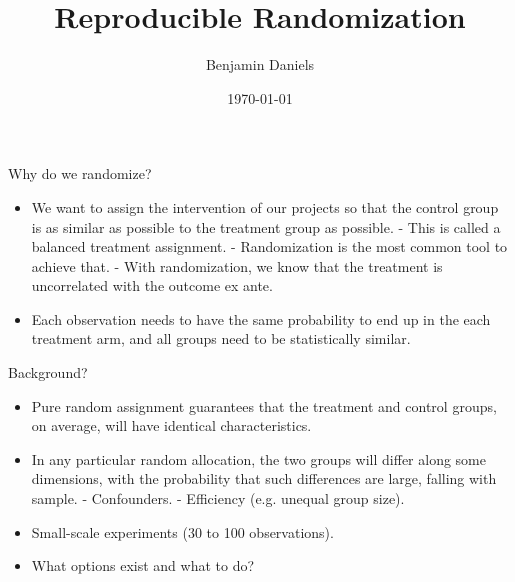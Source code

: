 \documentclass[aspectratio=169]{beamer}
\title{Reproducible Randomization}
\date{\today}
\author{Benjamin Daniels} %
\institute{Development Impact Evaluation (DIME) \newline The World Bank }
\begin{document}
	
{
	\maketitle
}

\begin{frame}{Why do we randomize?}

	\begin{itemize}[<default overlay specification>]
		\item<1> We want to assign the intervention of our projects so that the control group is as similar as possible to the treatment group as possible. 
			\newline - This is called a balanced treatment assignment. 
			\newline - Randomization is the most common tool to achieve that.
			\newline - With randomization, we know that the treatment is uncorrelated with the outcome ex ante.
		\item<1> Each observation needs to have the same probability to end up in the each treatment arm, and all groups need to be statistically similar. 
	\end{itemize}

\end{frame}


\begin{frame}{Background?}

\begin{itemize}[<default overlay specification>]
	\item<1> Pure random assignment guarantees that the treatment and control groups, on average, will have identical characteristics. 
	\item<1> In any particular random allocation, the two groups will differ along some dimensions, with the probability that such differences are large, falling with sample.
		\newline - Confounders. 
		\newline - Efficiency (e.g. unequal group size). 
	\item<1> Small-scale experiments (30 to 100 observations). 
	\item<1> What options exist and what to do?
\end{itemize}

\end{frame}
\end{document}
